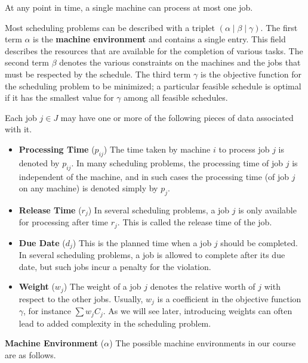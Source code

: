 At any point in time, a single machine can process at most one job. 

Most scheduling problems can be described with a triplet $(\alpha \mid 
\beta \mid \gamma)$. The first term $\alpha$ is the {\bf machine environment}
and contains a single entry. This field describes the resources that are 
available for the completion of various tasks. The second term $\beta$ 
denotes the various constraints on the machines and the jobs that must be 
respected by the schedule. The third term $\gamma$ is the objective function 
for the scheduling problem to be minimized; a particular feasible schedule 
is optimal if it has the smallest value for $\gamma$ among all feasible 
schedules. 

Each job $j \in J$ may have one or more of the following pieces of data 
associated with it. 

\begin{itemize}

    \item {\bf Processing Time} ($p_{ij}$) The time taken by machine $i$ 
    to process job $j$ is denoted by $p_{ij}$. In many scheduling problems, 
    the processing time of job $j$ is independent of the machine, and in 
    such cases the processing time (of job $j$ on any machine) is denoted
    simply by $p_j$.

    \item {\bf Release Time} ($r_j$) In several scheduling problems, a job 
    $j$ is only available for processing after time $r_j$. This is called 
    the release time of the job.

    \item {\bf Due Date} ($d_j$) This is the planned time when a job $j$ 
    should be completed. In several scheduling problems, a job is allowed 
    to complete after its due date, but such jobs incur a penalty for the 
    violation.

    \item {\bf Weight} ($w_j$) The weight of a job $j$ denotes the relative 
    worth of $j$ with respect to the other jobs. Usually, $w_j$ is a 
    coefficient in the objective function $\gamma$, for instance 
    $\sum w_j C_j$. As we will see later, introducing weights can often lead 
    to added complexity in the scheduling problem.

\end{itemize}

{\bf Machine Environment} ($\alpha$) The possible machine environments 
in our course are as follows.

